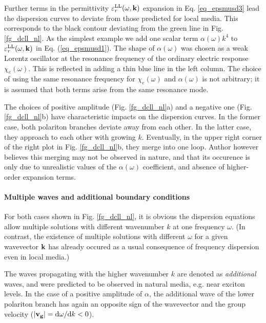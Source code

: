 Further terms in the permittivity $\varepsilon_r^\text{LL}(\omega,{\mathbf{k}})$ expansion in Eq. \ref{eq_epsmusd3} lead the dispersion curves to deviate from those predicted for local media. This corresponds to the black contour deviating from the green line in Fig. \ref{fg_dcll_nl}.
As the simplest example we add one scalar term $\alpha(\omega) k^4$ to $\varepsilon_r^\text{LL}(\omega,{\mathbf{k}})$ in Eq. (\ref{eq_epsmusd1}). The shape of $\alpha(\omega)$  was chosen as a weak Lorentz oscillator at the resonance frequency of the ordinary electric response $\chi_e(\omega)$. This is reflected in adding a thin blue line in the left column.
The choice of using the same resonance frequency for $\chi_e(\omega)$ and $\alpha(\omega)$ is not arbitrary; it is assumed that both terms arise from the same resonance mode.

The choices of positive amplitude (Fig. \ref{fg_dcll_nl}a) and a negative one (Fig. \ref{fg_dcll_nl}b) have characteristic impacts on the dispersion curves. In the former case, both polariton branches deviate away from each other. In the latter case, they approach to each other with growing $k$. Eventually, in the upper right corner of the right plot in Fig. \ref{fg_dcll_nl}b, they merge into one loop. Author however believes this merging may not be observed in nature, and that its occurence is only due to unrealistic values of the $\alpha(\omega)$ coefficient, and absence of higher-order expansion terms.

\paragraph{Multiple waves and additional boundary conditions}   %
For both cases shown in Fig. \ref{fg_dcll_nl}, it is obvious the dispersion equations allow multiple solutions with different wavenumber $k$ at one frequency $\omega$. (In contrast, the existence of multiple solutions with different $\omega$ for a given wavevector ${\mathbf{k}}$ has already occured as a usual consequence of frequency dispersion even in local media.)

The waves propagating with the higher wavenumber $k$ are denoted as \textit{additional} waves, and were predicted \cite{agranovich2006spatial, agranovich2004linear, krowne2007book, agranovich1962crystal} to be observed in natural media, e.g. near exciton levels. In the case of a positive amplitude of $\alpha$, the additional wave of the lower polariton branch has again an opposite sign of the wavevector and the group velocity ($|{\mathbf{v_g}}| = \mathrm{d}\omega/\mathrm{d}k < 0$).

